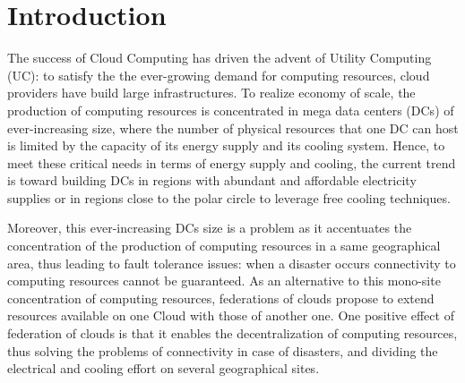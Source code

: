 \section{Introduction}
\label{sec:intro} 

The success of Cloud Computing has driven the advent of Utility Computing (UC): 
to satisfy the the ever-growing demand for computing resources, cloud providers 
have build large infrastructures. To realize economy of scale, the production
of computing resources is concentrated in mega data centers (DCs) of 
ever-increasing size, where the number of physical resources that one DC can 
host is limited by the capacity of its energy supply and its cooling system. 
Hence, to meet these critical needs in terms of energy supply and cooling, the 
current trend is toward building DCs in regions with abundant and affordable 
electricity supplies or in regions close to the polar circle to leverage free 
cooling techniques. 


Moreover, this ever-increasing DCs size is a problem as it accentuates the 
concentration of the production of computing resources in a same geographical
area, thus leading to fault tolerance issues: when a disaster occurs 
connectivity to computing resources cannot be guaranteed. As an alternative to 
this mono-site concentration of computing resources, federations of clouds 
propose to extend resources available on one Cloud with those of another one. 
One positive effect of federation of clouds is that it enables the 
decentralization of computing resources, thus solving the problems of 
connectivity in case of disasters, and dividing the electrical and cooling 
effort on several geographical sites.

